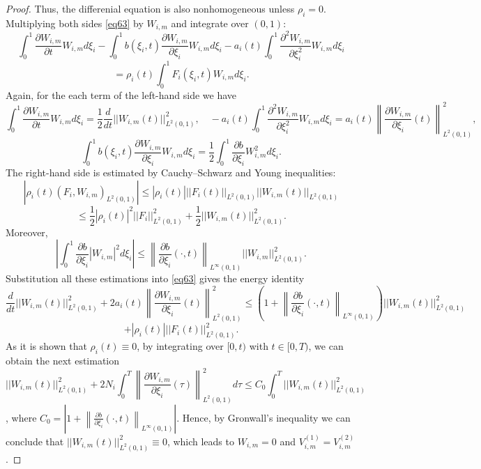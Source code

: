 \documentclass[10pt,a4paper]{amsart}
\begin{document}
\begin{proof}
    Thus, the differenial equation is also nonhomogeneous unless $\rho_i=0$. Multiplying both sides \eqref{eq63} by $W_{i,m}$ and integrate over $(0,1)$:
    $$\int_0^1\frac{\partial W_{i,m}}{\partial t}W_{i,m}d\xi_i-\int_0^1b(\xi_i,t)\frac{\partial W_{i,m}}{\partial \xi_i} W_{i,m}d\xi_i-a_i(t)\int_0^1\frac{\partial^2 W_{i,m}}{\partial\xi_i^2}W_{i,m}d\xi_i$$
    $$=\rho_i(t)\int_0^1F_i(\xi_i,t)W_{i,m}d\xi_i.$$
    Again, for the each term of the left-hand side we have
    $$\int_0^1\frac{\partial W_{i,m}}{\partial t}W_{i,m}d\xi_i=\frac{1}{2}\frac{d}{dt}||W_{i,m}(t)||_{L^2(0,1)}^2,\quad -a_i(t)\int_0^1\frac{\partial^2 W_{i,m}}{\partial\xi_i^2}W_{i,m}d\xi_i=a_i(t)\left\|\frac{\partial W_{i,m}}{\partial\xi_i}(t)\right\|_{L^2(0,1)}^2,$$
    $$\int_0^1b(\xi_i,t)\frac{\partial W_{i,m}}{\partial \xi_i} W_{i,m}d\xi_i=\frac{1}{2}\int_0^1\frac{\partial b}{\partial \xi_i}W_{i,m}^2d\xi_i.$$
    The right-hand side is estimated by Cauchy–Schwarz and Young inequalities:
    $$|\rho_i(t)(F_i,W_{i,m})_{L^2(0,1)}|\leq |\rho_i(t)|||F_i(t)||_{L^{2}(0,1)}||W_{i,m}(t)||_{L^2(0,1)}$$
    $$\leq \frac{1}{2}|\rho_i(t)|^2||F_i||_{L^2(0,1)}^2+\frac{1}{2}||W_{i,m}(t)||_{L^2(0,1)}^2.$$
    Moreover, 
    $$\left|\int_0^1\frac{\partial b}{\partial \xi_i}|W_{i,m}|^2d\xi_i\right|\leq \left\|\frac{\partial b}{\partial \xi_i}(\cdot,t)\right\|_{L^{\infty}(0,1)}||W_{i,m}||_{L^2(0,1)}^2.$$
    Substitution all these estimations into \eqref{eq63} gives the energy identity
    $$\frac{d}{dt}||W_{i,m}(t)||_{L^2(0,1)}^2+2a_i(t)\left\|\frac{\partial W_{i,m}}{\partial\xi_i}(t)\right\|_{L^2(0,1)}^2\leq\left(1+\left\|\frac{\partial b}{\partial \xi_i}(\cdot,t)\right\|_{L^{\infty}(0,1)}\right)||W_{i,m}(t)||_{L^2(0,1)}^2$$
    $$+|\rho_i(t)|||F_i(t)||_{L^2(0,1)}^2.$$
    As it is shown that $\rho_i(t)\equiv 0$, by integrating over $[0,t)$ with $t\in [0,T)$, we can obtain the next estimation
    $$||W_{i,m}(t)||_{L^2(0,1)}^2+2N_i\int_0^T\left\|\frac{\partial W_{i,m}}{\partial\xi_i}(\tau)\right\|_{L^2(0,1)}^2d\tau \leq C_0\int_0^T ||W_{i,m}(t)||_{L^2(0,1)}^2$$,
    where $C_0=\left|1+\left\|\frac{\partial b}{\partial \xi_i}(\cdot,t)\right\|_{L^{\infty}(0,1)}\right|$. Hence, by Gronwall's inequality we can conclude that $||W_{i,m}(t)||_{L^2(0,1)}^2\equiv 0$, which leads to $W_{i,m}=0$ and $V_{i,m}^{(1)}=V_{i,m}^{(2)}$.
\end{proof}
\end{document}
